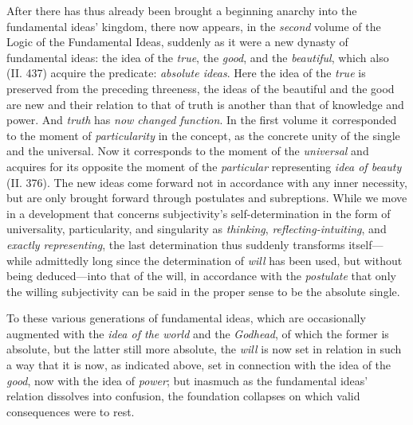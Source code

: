 \documentclass[12pt,a4paper]{book}
\begin{document}
After there has thus already been brought a beginning anarchy into the fundamental ideas' kingdom,
there now appears, in the \emph{second} volume of the Logic of the Fundamental Ideas, suddenly as it were
a new dynasty of fundamental ideas: the idea of the \emph{true}, the \emph{good}, and the
\emph{beautiful}, which also (II. 437) acquire the predicate: \emph{absolute ideas}. Here the idea
of the \emph{true} is preserved from the preceding threeness, the ideas of the beautiful
and the good are new and their relation to that of truth is another than that of knowledge
and power. And \emph{truth} has \emph{now changed function}. In the first volume it corresponded to the
moment of \emph{particularity} in the concept, as the concrete unity of the single and the universal.
Now it corresponds to the moment of the \emph{universal} and acquires for its opposite the
moment of the \emph{particular} representing \emph{idea of beauty} (II. 376). The new ideas
come forward not in accordance with any inner necessity, but are only brought forward through
postulates and subreptions. While we move in a development that concerns subjectivity's
self-determination in the form of universality, particularity, and singularity as \emph{thinking},
\emph{reflecting-intuiting}, and \emph{exactly representing}, the last determination thus suddenly
transforms itself---while admittedly long since the determination of \emph{will} has been used, but without
being deduced---into that of the will, in accordance with the \emph{postulate} that only the willing
subjectivity can be said in the proper sense to be the absolute single.

To these various generations of fundamental ideas, which are occasionally augmented with the
\emph{idea of the world} and the \emph{Godhead}, of which the former is absolute, but the latter still more
absolute, the \emph{will} is now set in relation in such a way that it is now, as indicated above, set in
connection with the idea of the \emph{good}, now with the idea of \emph{power}; but inasmuch as the
fundamental ideas' relation dissolves into confusion, the foundation collapses on which valid
consequences were to rest.
\end{document}
